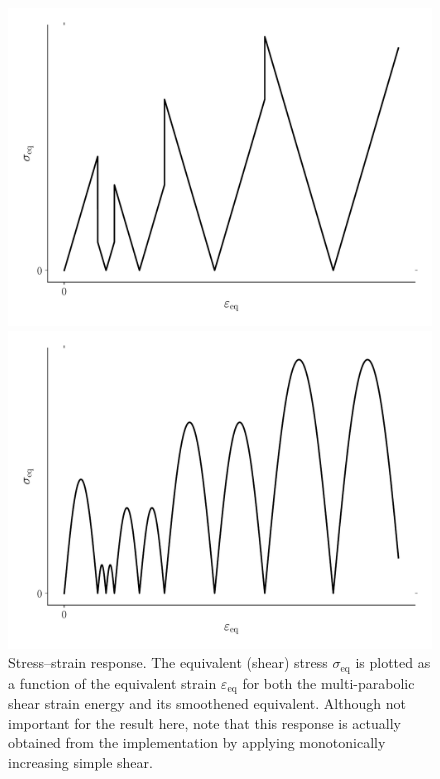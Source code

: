 \documentclass[times,namecite]{goose-article}
\begin{document}
\begin{figure}[htp]
  \centering
  \captionsetup[subfigure]{justification=centering}
  \begin{minipage}[t]{.49\textwidth}
    \centering
    \includegraphics[width=1.\textwidth]{figures/stress-strain}
  \end{minipage}
  \hfill
  \begin{minipage}[t]{.49\textwidth}
    \centering
    \includegraphics[width=1.\textwidth]{figures/stress-strain-smooth}
  \end{minipage}
  \caption{Stress--strain response. The equivalent (shear) stress $\sigma_\mathrm{eq}$ is plotted as a function of the equivalent strain $\varepsilon_\mathrm{eq}$ for both the multi-parabolic shear strain energy and its smoothened equivalent. Although not important for the result here, note that this response is actually obtained from the implementation by applying monotonically increasing simple shear.}
  \label{fig:sigeq-plas}
\end{figure}
\end{document}
